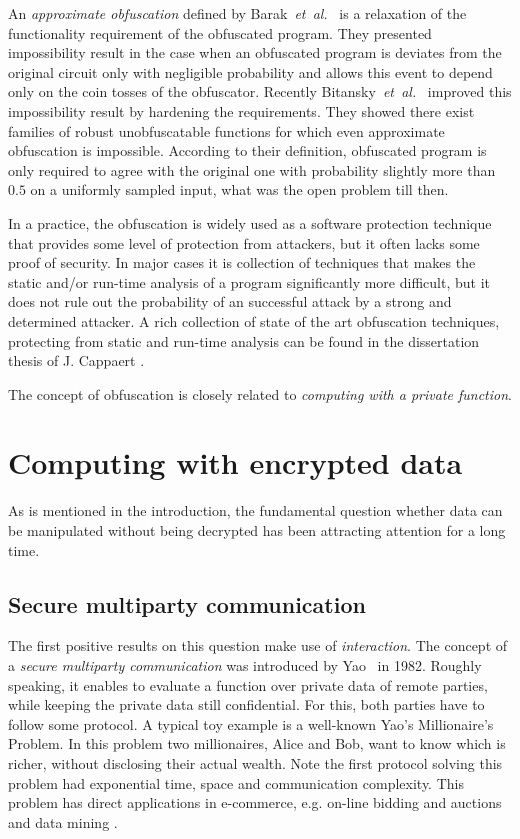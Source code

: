 \documentclass[11pt,oneside,final]{fithesis2}
\newcommand{\eal}{\emph{et~al.}}
\begin{document}
    An \emph{approximate obfuscation} defined by Barak~\eal~\citep{Barak:2012:POP:2160158.2160159} is a relaxation of the functionality
    requirement of the obfuscated program. They presented impossibility result in the case when an obfuscated program is deviates from the original
    circuit only with negligible probability and allows this event to depend only on the coin tosses of the obfuscator. Recently 
    Bitansky~\eal~\citep{journals/iacr/BitanskyP12} improved this impossibility result by hardening the requirements.
    They showed there exist families of robust unobfuscatable functions for which even approximate obfuscation is impossible.
    According to their definition, obfuscated program is only required to agree with the original one with probability slightly more than $0.5$
    on a uniformly sampled input, what was the open problem till then.
    
    In a practice, the obfuscation is widely used as a software protection technique that provides some level of protection from attackers, but 
    it often lacks some proof of security. In major cases it is collection of techniques that makes the static and/or run-time analysis of a program
    significantly more difficult, but it does not rule out the probability of an successful attack by a strong and determined attacker. 
    A rich collection of state of the art obfuscation techniques, protecting from static and run-time analysis can be found in the dissertation thesis
    of J. Cappaert \citep{codeObfuscation}. 
    
    The concept of obfuscation is closely related to \emph{computing with a private function}.

\section{Computing with encrypted data}
As is mentioned in the introduction, the fundamental question whether data can be manipulated without being 
decrypted has been attracting attention for a long time. 

\subsection{Secure multiparty communication}
The first positive results on this question make use of \emph{interaction}. The concept of a \emph{secure multiparty communication} was 
introduced by Yao~\citep{Yao:1982:PSC:1398511.1382751} in 1982. Roughly speaking, it enables to evaluate a function over private
data of remote parties, while keeping the private data still confidential. For this, both parties have to follow some protocol.
A typical toy example is a well-known 
Yao's Millionaire's Problem. In this problem two millionaires, Alice and Bob, want to know which is richer, without 
disclosing their actual wealth. Note the first protocol solving this problem had exponential time, space and communication complexity. 
This problem has direct applications in e-commerce, e.g. on-line bidding and auctions and data mining \citep{smcBook}.
\end{document}
